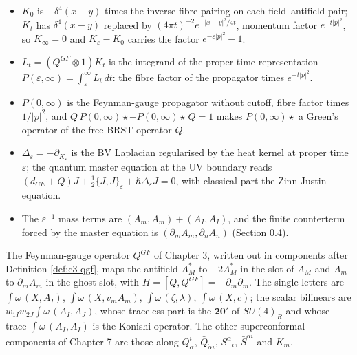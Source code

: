 \begin{remark}
\begin{itemize}
\item $K_0$ is $-\delta^4(x-y)$ times the inverse fibre pairing on each field--antifield pair; $K_t$ has $\delta^4(x-y)$ replaced by $(4\pi t)^{-2}e^{-|x-y|^2/4t}$, momentum factor $e^{-t|p|^2}$, so $K_\infty=0$ and $K_\varepsilon-K_0$ carries the factor $e^{-\varepsilon|p|^2}-1$.
\item $L_t=(Q^{GF}\otimes1)K_t$ is the integrand of the proper-time representation $P(\varepsilon,\infty)=\int_\varepsilon^\infty L_t\,dt$: the fibre factor of the propagator times $e^{-t|p|^2}$.
\item $P(0,\infty)$ is the Feynman-gauge propagator without cutoff, fibre factor times $1/|p|^2$, and $Q\,P(0,\infty)\star+P(0,\infty)\star\,Q=1$ makes $P(0,\infty)\star$ a Green's operator of the free BRST operator $Q$.
\item $\Delta_\varepsilon=-\partial_{K_\varepsilon}$ is the BV Laplacian regularised by the heat kernel at proper time $\varepsilon$; the quantum master equation at the UV boundary reads $(d_{CE}+Q)J+\tfrac12\{J,J\}_\varepsilon+\hbar\Delta_\varepsilon J=0$, with classical part the Zinn-Justin equation.
\item The $\varepsilon^{-1}$ mass terms are $(A_m,A_m)+(A_I,A_I)$, and the finite counterterm forced by the master equation is $(\partial_mA_m,\partial_nA_n)$ (Section 0.4).
\end{itemize}
\end{remark}

\begin{remark}
The Feynman-gauge operator $Q^{GF}$ of Chapter 3, written out in components after Definition \ref{def:c3-qgf}, maps the antifield $A^*_M$ to $-2A^*_M$ in the slot of $A_M$ and $A_m$ to $\partial_mA_m$ in the ghost slot, with $H=[Q,Q^{GF}]=-\partial_m\partial_m$. The single letters are $\int\omega\,(X,A_I)$, $\int\omega\,(X,v_mA_m)$, $\int\omega\,(\zeta,\lambda)$, $\int\omega\,(X,c)$; the scalar bilinears are $w_{1I}w_{2J}\int\omega\,(A_I,A_J)$, whose traceless part is the $\mathbf{20'}$ of $SU(4)_R$ and whose trace $\int\omega\,(A_I,A_I)$ is the Konishi operator. The other superconformal components of Chapter 7 are those along $Q^i_\alpha$, $\bar Q_{\dot\alpha i}$, $S^\alpha{}_i$, $\bar S^{\dot\alpha i}$ and $K_m$.
\end{remark}

